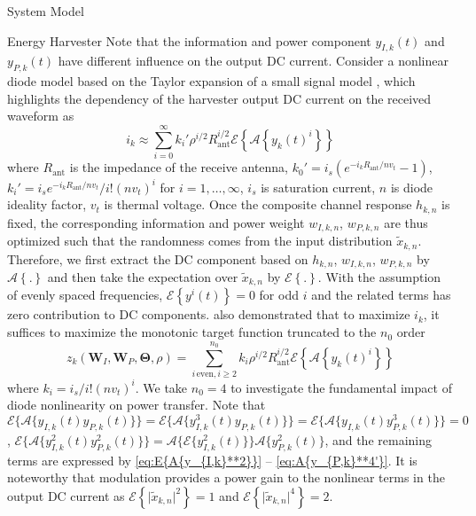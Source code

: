 \documentclass{IEEEtran}
\begin{document}
\begin{section}{System Model}
	\begin{subsection}{Energy Harvester}
		Note that the information and power component $y_{I,k}(t)$ and $y_{P,k}(t)$ have different influence on the output DC current. Consider a nonlinear diode model based on the Taylor expansion of a small signal model \cite{Clerckx2018b,Clerckx2016a}, which highlights the dependency of the harvester output DC current on the received waveform as
		\begin{equation}\label{eq:i_k}
			i_k\approx\sum_{i=0}^{\infty}{k_i'}{\rho^{i/2}}{R_{\text{ant}}^{i/2}}\mathcal{E}\left\{{\mathcal{A}\left\{y_k(t)^i\right\}}\right\}
		\end{equation}
		where $R_{\text{ant}}$ is the impedance of the receive antenna, $k_0'=i_s(e^{-i_kR_{\text{ant}}/nv_t}-1)$, $k_i'=i_se^{-i_kR_{\text{ant}}/nv_t}/i!(nv_t)^i$ for $i=1,\dots,\infty$, $i_s$ is saturation current, $n$ is diode ideality factor, $v_t$ is thermal voltage. Once the composite channel response $h_{k,n}$ is fixed, the corresponding information and power weight $w_{I,k,n}$, $w_{P,k,n}$ are thus optimized such that the randomness comes from the input distribution $\tilde{x}_{k,n}$. Therefore, we first extract the DC component based on $h_{k,n}$, $w_{I,k,n}$, $w_{P,k,n}$ by $\mathcal{A}\left\{.\right\}$ and then take the expectation over $\tilde{x}_{k,n}$ by $\mathcal{E}\left\{.\right\}$. With the assumption of evenly spaced frequencies, $\mathcal{E}\left\{y^i(t)\right\}=0$ for odd $i$ and the related terms has zero contribution to DC components. \cite{Clerckx2016a} also demonstrated that to maximize $i_k$, it suffices to maximize the monotonic target function truncated to the $n_0$ order
		\begin{equation}\label{eq:z_k}
			z_k(\boldsymbol{W}_I,\boldsymbol{W}_P,\boldsymbol{\Theta},\rho)=\sum_{i\,\text{even},i\ge2}^{n_0}{k_i}{\rho^{i/2}}{R_{\text{ant}}^{i/2}}{\mathcal{E}\left\{\mathcal{A}\left\{y_k(t)^i\right\}\right\}}
		\end{equation}
		where $k_i=i_s/i!(nv_t)^i$. We take $n_0=4$ to investigate the fundamental impact of diode nonlinearity on power transfer. Note that $\mathcal{E}\{\mathcal{A}\{y_{I,k}(t)y_{P,k}(t)\}\}=\mathcal{E}\{\mathcal{A}\{y_{I,k}^3(t)y_{P,k}(t)\}\}=\mathcal{E}\{\mathcal{A}\{y_{I,k}(t)y_{P,k}^3(t)\}\}=0$, $\mathcal{E}\{\mathcal{A}\{y_{I,k}^2(t)y_{P,k}^2(t)\}\}=\mathcal{A}\{\mathcal{E}\{y_{I,k}^2(t)\}\}\mathcal{A}\{y_{P,k}^2(t)\}$, and the remaining terms are expressed by \ref{eq:E{A{y_{I,k}**2}}} -- \ref{eq:A{y_{P,k}**4'}}. It is noteworthy that modulation provides a power gain to the nonlinear terms in the output DC current as $\mathcal{E}\left\{\lvert\tilde{x}_{k,n}\rvert^2\right\}=1$ and $\mathcal{E}\left\{\lvert\tilde{x}_{k,n}\rvert^4\right\}=2$.

\end{subsection}
\end{section}
\end{document}
